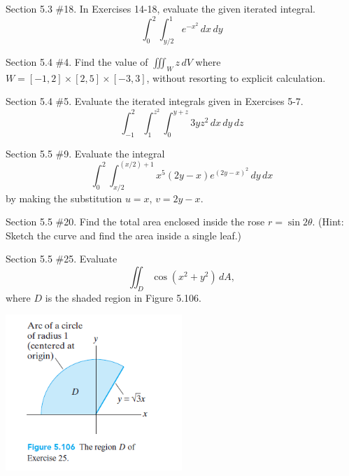\documentclass[12pt,letterpaper]{hmcpset}
\begin{document}
\newpage

\begin{problem}
Section 5.3 \#18. In Exercises 14-18, evaluate the given iterated integral.
$$ \int_{0}^{2} \int_{y/2}^{1} e^{-x^2} \,dx \,dy$$
\end{problem}

\newpage

\begin{problem}
Section 5.4 \#4. Find the value of $\iiint_{W} z \,dV$ where $W = [-1, 2] \times [2, 5] \times [-3, 3]$, without resorting to explicit calculation.
\end{problem}

\newpage

\begin{problem}
Section 5.4 \#5. Evaluate the iterated integrals given in Exercises 5-7.
$$ \int_{-1}^{2} \int_{1}^{z^2} \int_{0}^{y+z} 3yz^2 \,dx \,dy \,dz $$
\end{problem}

\newpage

\begin{problem}
Section 5.5 \#9. Evaluate the integral
$$ \int_{0}^{2} \int_{x/2}^{(x/2)+1} x^5 (2y-x) e^{(2y-x)^2} \,dy \,dx $$
by making the substitution $u=x$, $v=2y-x$.
\end{problem}

\newpage

\begin{problem}
Section 5.5 \#20. Find the total area enclosed inside the rose $r = \sin{2 \theta}$. (Hint: Sketch the curve and find the area inside a single leaf.)
\end{problem}

\newpage

\begin{problem}
Section 5.5 \#25. Evaluate
$$ \iint_D \cos{(x^2 + y^2)} \,dA, $$
where $D$ is the shaded region in Figure 5.106.
\begin{center}
\includegraphics[width=0.5\textwidth]{figure5-106.png}
\end{center}
\end{problem}
\end{document}
